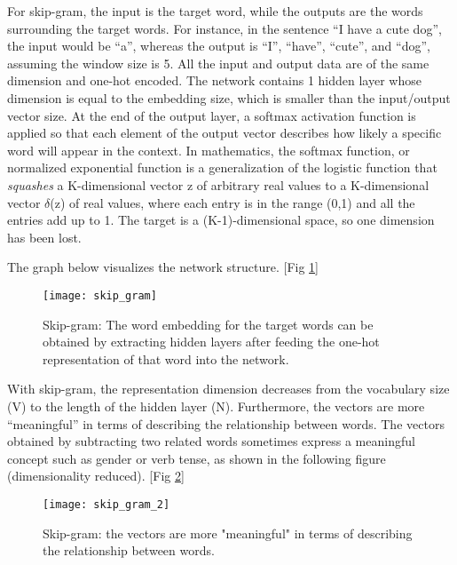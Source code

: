 For skip-gram, the input is the target word, while the outputs are the words surrounding the target words. For instance, in the sentence “I have a cute dog”, the input would be “a”, whereas the output is “I”, “have”, “cute”, and “dog”, assuming the window size is 5. All the input and output data are of the same dimension and one-hot encoded. The network contains 1 hidden layer whose dimension is equal to the embedding size, which is smaller than the input/output vector size. At the end of the output layer, a
softmax activation function is applied so that each element of the output vector describes how likely a specific word will appear in the context.
In mathematics, the softmax function, or normalized exponential function is a generalization of the logistic function that \textit{squashes} a K-dimensional vector z of arbitrary real values to a K-dimensional vector $\delta$(z) of real values, where each entry is in the range (0,1) and all the entries add up to 1. The target is a (K-1)-dimensional space, so one dimension has been lost. \cite{wiki:softmax}

The graph below visualizes the network structure. [Fig \ref{fig:skip_gram}]

\begin{figure}[ht]
	\centering
	\texttt{[image: skip\_gram]}
	\caption[Skip-gram evaluation]{Skip-gram: The word embedding for the target words can be obtained by extracting hidden layers after feeding the one-hot representation of that word into the network.}
	\label{fig:skip_gram}
\end{figure}

With skip-gram, the representation dimension decreases from the vocabulary size (V) to the length of the hidden layer (N). Furthermore, the vectors are more “meaningful” in terms of describing the relationship between words. The vectors obtained by subtracting two related words sometimes express a meaningful concept such as gender or verb tense, as shown in the following figure (dimensionality reduced). [Fig \ref{fig:skip_gram_2}]

\begin{figure}[ht]
	\centering
	\texttt{[image: skip\_gram\_2]}
	\caption[Skip-gram relationship between words]{Skip-gram: the vectors are more "meaningful" in terms of describing the relationship between words.}
	\label{fig:skip_gram_2}
\end{figure}



